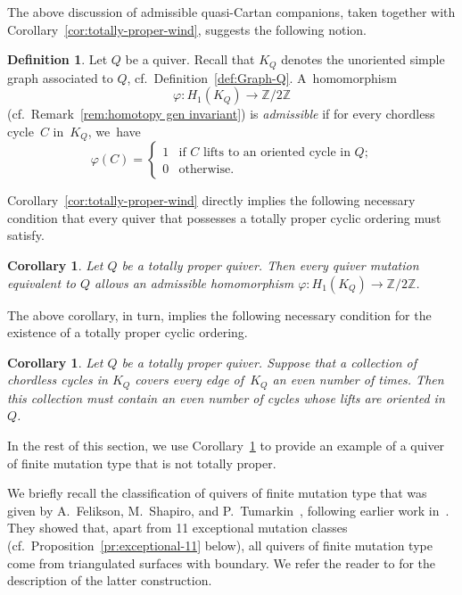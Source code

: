\documentclass[11pt, letterpaper]{amsart}
\newtheorem{corollary}[theorem]{Corollary}
\theoremstyle{definition}
\newtheorem{definition}[theorem]{Definition}
\numberwithin{equation}{section}
\def\ZZ{{\mathbb Z}}
\newcommand\GQ{K_Q}
\begin{document}
The above discussion of admissible quasi-Cartan companions, taken together with
Corollary~\ref{cor:totally-proper-wind}, suggests the following notion. 

\begin{definition}
\label{def:admissible-quiver}
Let $Q$ be a quiver. Recall that $\GQ$ denotes the unoriented simple graph associated to $Q$,
cf.\ Definition~\ref{def:Graph-Q}.
A~homo\-morphism 
\begin{equation*}
\varphi:H_1(\GQ)\to \ZZ/2\ZZ
\end{equation*}
(cf.\ Remark~\ref{rem:homotopy gen invariant}) 
is  \emph{admissible} 
if for every chordless cycle~$C$ in~$\GQ$, we~have
\begin{equation*}
\varphi(C)=\begin{cases}
1 & \text{if $C$ lifts to an oriented cycle in $Q$;} \\
0 & \text{otherwise.}
\end{cases}
\end{equation*}
\end{definition}

Corollary~\ref{cor:totally-proper-wind} directly implies the following necessary condition
that every quiver that possesses a totally proper cyclic ordering must satisfy. 

\begin{corollary}
Let $Q$ be a totally proper quiver.
Then every quiver mutation equivalent to $Q$  
allows an admissible homo\-morphism $\varphi:H_1(\GQ)\to \ZZ/2\ZZ$. 
\end{corollary}

The above corollary, in turn, implies the following necessary condition for the existence of a totally proper cyclic ordering. 

\begin{corollary}
\label{cor:even-paving}
Let $Q$ be a totally proper quiver.
Suppose that a collection of chordless cycles in $\GQ$ 
covers every edge of~$\GQ$ an even number of times. 
Then this collection must contain an even number of cycles whose lifts are oriented in~$Q$. 
\end{corollary}

In the rest of this section, we use Corollary~\ref{cor:even-paving} 
to provide an example of a quiver of finite mutation type that is not totally proper. 

We briefly recall the classification of quivers of finite mutation type that was given by A.~Felikson, M.~Shapiro, and P.~Tumarkin~\cite{FeShTu},
following earlier work in~\cite{cats1, Derksen-Owen}. 
They showed that, apart from 11 exceptional mutation classes (cf.\ Proposition~\ref{pr:exceptional-11} below), 
all quivers of finite mutation type come from triangulated surfaces with boundary. 
We refer the reader to \cite{cats1} for the description of the latter construction. 
\end{document}
